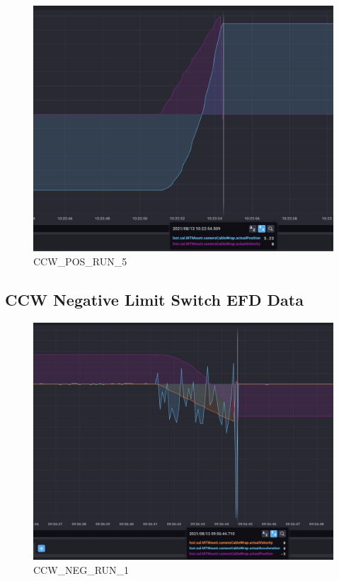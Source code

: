 \documentclass[SE,authoryear,toc, lsstdraft]{lsstdoc}
\begin{document}
\begin{figure}
  \includegraphics[width=\linewidth]{media/ccw_pos_5.png}
  \caption{CCW\_POS\_RUN\_5}
  \label{fig:CCW_POS_RUN_5}
\end{figure}
\newpage
\subsection{CCW Negative Limit Switch EFD Data}
\begin{figure}
  \includegraphics[width=\linewidth]{media/ccw_neg_1.png}
  \caption{CCW\_NEG\_RUN\_1}
  \label{fig:CCW_NEG_RUN_1}
\end{figure}
\end{document}
